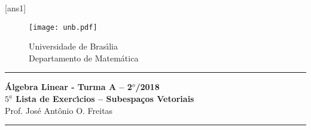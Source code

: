 \documentclass[12pt]{exam}
\newtheorem{exercicio}{}
\newcommand{\cp}[1]{\mathbb{#1}}
\newcommand{\vesp}[1]{\vspace{ #1  cm}}
\begin{document}
\pagestyle{empty}

[ans1]

\begin{figure}[h]
        \begin{minipage}[c]{1.7cm}
        \texttt{[image: unb.pdf]}
        \end{minipage}%
        \hspace{0pt}
        \begin{minipage}[c]{4in}
          {Universidade de Bras{\'\i}lia} \\
          {Departamento de Matem{\'a}tica}
\end{minipage}
\end{figure}

\vesp{-0.35} \hrule

\begin{center}
{\Large\bf \'Algebra Linear - Turma A -- 2$^{o}$/2018} \\ \vspace{9pt} {\large\bf
  $5^{\underline{a}}$ Lista de Exerc{\'\i}cios -- Subespa\c{c}os Vetoriais}\\ \vspace{9pt} Prof. Jos{\'e} Ant{\^o}nio O. Freitas
\end{center}
\hrule

\vesp{.6}


\end{document}
